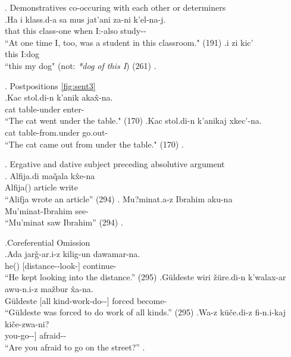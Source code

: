     
\ex. Demonstratives co-occuring with each other or determiners \\
    \ag.\label{sent:ex6a}Ha i klass.d-a sa mus jat'ani za-ni k'el-na-j. \\
    that this class-\Inessc[] one when \Indf[] I:\Erg[]-also study-\Aori[]-\Pst[] \\
    ``At one time I, too, was a student in this classroom." (191)
    \bg.\label{sent:ex6b}i zi kic' \\
    this I:\Gen[] dog \\
    ``this my dog" (not: \textit{*dog of this I}) (261)
    \z.

\ex. \label{sent:ex3}Postpositions \ref{fig:sent3}\\
    \ag.\label{sent:ex3a}Kac stol.di-n k'anik aka\^{x}-na. \\
        cat table-\Gen[] under enter-\Aori[] \\
        ``The cat went under the table." (170) 
    \bg.\label{sent:ex3b}Kac stol.di-n k'anikaj xkec'-na. \\
        cat table-\Gen[] from.under go.out-\Aori[] \\
        ``The cat came out from under the table." (170)
    \z.

\ex.\label{sent:ex5} Ergative and dative subject preceding absolutive argument \\
    \ag. Alfija.di ma\~{q}ala k\^{x}e-na \\
        Alfija(\Erg[]) article write \\
        ``Alifja wrote an article'' (294)
    \bg. Mu?minat.a-z Ibrahim aku-na \\
        Mu'minat-\Dat[] Ibrahim see-\Aori \\
        ``Mu'minat saw Ibrahim'' (294)
    \z.

\ex.\label{sent:ex8}Coreferential Omission \\
    \ag.\label{sent:ex8a}Ada jar\v{g}-ar.i-z kilig-un dawamar-na. \\
    he(\Erg[]) [distance-\Pl[]-\Dat[] look-\Masd[]] continue-\Aori[] \\
    ``He kept looking into the distance.'' (295)
    \bg.\label{sent:ex8b}G\"{u}ldeste wiri \v{z}\"{u}re.di-n k'walax-ar awu-n.i-z ma\v{z}bur \^{x}a-na. \\
    G\"{u}ldeste [all kind-\Gen[] work-\Pl[] do-\Masd[]-\Dat[]] forced become-\Aori[] \\
    ``G\"{u}ldeste was forced to do work of all kinds.'' (295)
    \cg.\label{sent:ex8c}Wa-z k\"{u}\v{c}e.di-z fi-n.i-kaj ki\v{c}e-zwa-ni? \\
    you-\Dat[] [street-\Dat[] go-\Masd[]-\Sbelc[]] afraid-\Impf[]-\Q[] \\
    ``Are you afraid to go on the street?''
    \z.

